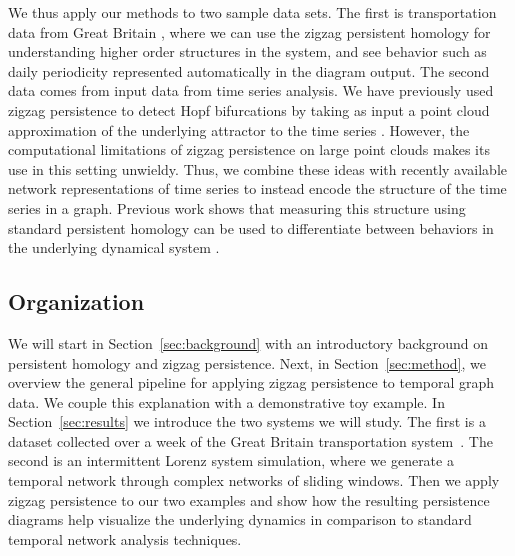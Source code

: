 We thus apply our methods to two sample data sets. 
The first is transportation data from Great Britain \cite{Gallotti2015}, where we can use the zigzag persistent homology for understanding higher order structures in the system, and see behavior such as daily periodicity represented automatically in the diagram output. 
The second data comes from input data from time series analysis. 
We have previously used zigzag persistence to detect Hopf bifurcations  by taking as input a point cloud approximation of the underlying attractor to the time series \cite{Tymochko2020}. 
However, the computational limitations of zigzag persistence on large point clouds makes its use in this setting unwieldy. 
Thus, we combine these ideas with recently available network representations of time series \cite{McCullough2015} to 
%
instead encode the structure of the time series in a graph.
Previous work shows that measuring this structure using standard persistent homology can be used to differentiate between behaviors in the underlying dynamical system \cite{Myers2019,Myers2022}. 





%
%
%
%
%
%
%
%

%
%
%
%

%
%
%
%
%
%
%
%
%

%
%

%
%
%
%
%
%
%

%
%

%
%

%
%


%


\subsection{Organization}

We will start in Section~\ref{sec:background} with an introductory background on persistent homology and zigzag persistence.
Next, in Section~\ref{sec:method},  we overview the general pipeline for applying zigzag persistence to temporal graph data. We couple this explanation with a demonstrative toy example. 
In Section~\ref{sec:results} we  introduce the two systems we will study. 
The first is a dataset collected over a week of the Great Britain transportation system~\cite{Gallotti2015}. 
The second is an intermittent Lorenz system simulation, where we generate a temporal network through complex networks of sliding windows. %
Then we apply zigzag persistence to our two examples and show how the resulting persistence diagrams help visualize the underlying dynamics in comparison to standard temporal network analysis techniques.



